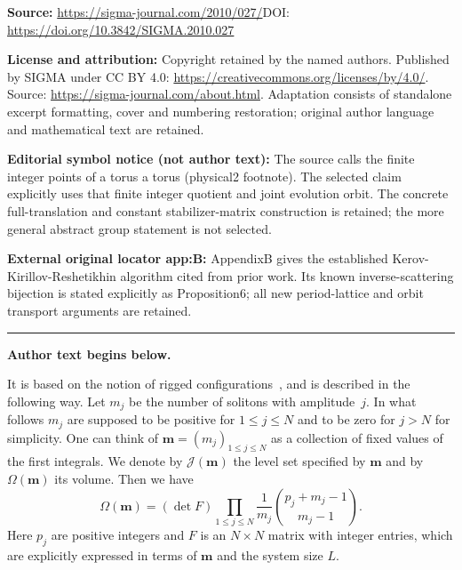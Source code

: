 \documentclass[11pt]{article}
\newcommand{\J}{{\mathcal J}}
\newcommand{\m}{{\boldsymbol m}}
\begin{document}
\noindent\textbf{Source:} \url{https://sigma-journal.com/2010/027/}\quad DOI: \url{https://doi.org/10.3842/SIGMA.2010.027}\par
\noindent\textbf{License and attribution:} Copyright retained by the named authors. Published by SIGMA under CC BY 4.0: \url{https://creativecommons.org/licenses/by/4.0/}. Source: \url{https://sigma-journal.com/about.html}. Adaptation consists of standalone excerpt formatting, cover and numbering restoration; original author language and mathematical text are retained.\par
\noindent\textbf{Editorial symbol notice (not author text):} The source calls the finite integer points of a torus a torus (physical2 footnote). The selected claim explicitly uses that finite integer quotient and joint evolution orbit. The concrete full-translation and constant stabilizer-matrix construction is retained; the more general abstract group statement is not selected.\par
\noindent\textbf{External original locator app:B:} AppendixB gives the established Kerov-Kirillov-Reshetikhin algorithm cited from prior work. Its known inverse-scattering bijection is stated explicitly as Proposition6; all new period-lattice and orbit transport arguments are retained.\par
\medskip\hrule\medskip\noindent\textbf{Author text begins below.}\par
\setcounter{section}{1}
\setcounter{subsection}{0}
\setcounter{subsubsection}{0}
\setcounter{equation}{0}
It is based on the notion of rigged conf\/igurations~\mbox{\cite{KKR,KR}}, and is described in the following way.
Let $m_j$ be the number of solitons with amplitude~$j$.
In what follows $m_j$ are supposed to be positive for $1 \leq j \leq N$ and to be zero for $j > N$ for simplicity.
One can think of $\m=(m_j)_{1 \leq j \leq N}$ as a collection of f\/ixed values of the f\/irst integrals.
We denote by $\J (\m)$ the level set specif\/ied by $\m$
and by $\Omega(\m)$
its volume.
Then we have \cite{KTT}
\begin{equation}
\Omega(\m) =
(\det F)\prod_{1 \leq j \leq N} \frac{1}{m_j}
\binom{p_j + m_j - 1}{m_j - 1}.\label{eq:oct10_1}
\end{equation}
Here $p_j$ are positive integers and $F$ is an $N \times N$ matrix with integer entries,
which are explicitly expressed in terms of $\m$ and the system size $L$.
\end{document}
